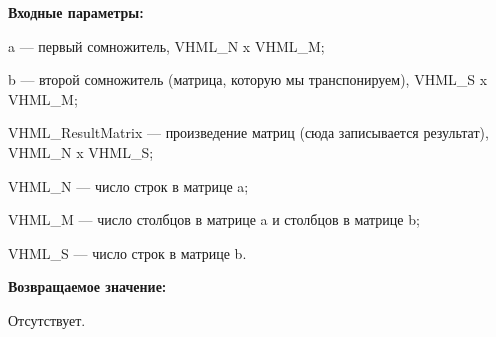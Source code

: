 \textbf{Входные параметры:}
 
a --- первый сомножитель, VHML\_N x VHML\_M;
 
b --- второй сомножитель (матрица, которую мы транспонируем), VHML\_S x VHML\_M;
 
VHML\_ResultMatrix --- произведение матриц (сюда записывается результат), VHML\_N x VHML\_S;
 
VHML\_N --- число строк в матрице a;
 
VHML\_M --- число столбцов в матрице a и столбцов в матрице b;
 
VHML\_S --- число строк в матрице b.

\textbf{Возвращаемое значение:}

Отсутствует.